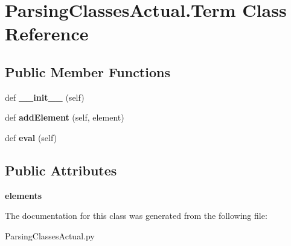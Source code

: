 \hypertarget{class_parsing_classes_actual_1_1_term}{}\section{Parsing\+Classes\+Actual.\+Term Class Reference}
\label{class_parsing_classes_actual_1_1_term}
\subsection*{Public Member Functions}
\begin{DoxyCompactItemize}
\item 
def {\bfseries \+\_\+\+\_\+init\+\_\+\+\_\+} (self)\hypertarget{class_parsing_classes_actual_1_1_term_a59155d0cbc1245f862052b47fd257739}{}\label{class_parsing_classes_actual_1_1_term_a59155d0cbc1245f862052b47fd257739}

\item 
def {\bfseries add\+Element} (self, element)\hypertarget{class_parsing_classes_actual_1_1_term_adaa3917c680bb2cc250b23f02333f03a}{}\label{class_parsing_classes_actual_1_1_term_adaa3917c680bb2cc250b23f02333f03a}

\item 
def {\bfseries eval} (self)\hypertarget{class_parsing_classes_actual_1_1_term_a3fbb50911cfcdfdb1453c0882cf82cc5}{}\label{class_parsing_classes_actual_1_1_term_a3fbb50911cfcdfdb1453c0882cf82cc5}

\end{DoxyCompactItemize}
\subsection*{Public Attributes}
\begin{DoxyCompactItemize}
\item 
{\bfseries elements}\hypertarget{class_parsing_classes_actual_1_1_term_a5281bd694526cb3549ca900f49628b51}{}\label{class_parsing_classes_actual_1_1_term_a5281bd694526cb3549ca900f49628b51}

\end{DoxyCompactItemize}


The documentation for this class was generated from the following file\+:\begin{DoxyCompactItemize}
\item 
Parsing\+Classes\+Actual.\+py\end{DoxyCompactItemize}
